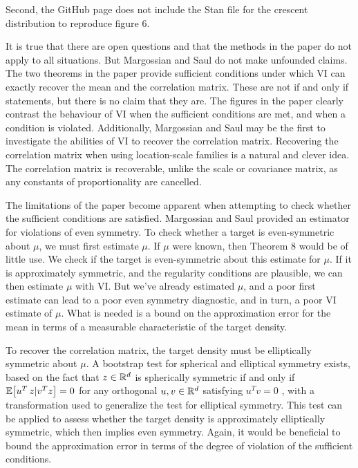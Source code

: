 \documentclass{article}
\begin{document}
Second, the GitHub page does not include the Stan file for the crescent distribution to reproduce figure 6.


It is true that there are open questions and that the methods in the paper do not apply to all situations.
But Margossian and Saul do not make unfounded claims.
The two theorems in the paper provide sufficient conditions under which VI can exactly recover the mean and the correlation matrix.
These are not if and only if statements, but there is no claim that they are.
The figures in the paper clearly contrast the behaviour of VI when the sufficient conditions are met, and when a condition is violated.
Additionally, Margossian and Saul may be the first to investigate the abilities of VI to recover the correlation matrix.
Recovering the correlation matrix when using location-scale families is a natural and clever idea.
The correlation matrix is recoverable, unlike the scale or covariance matrix, as any constants of proportionality are cancelled.

The limitations of the paper become apparent when attempting to check whether the sufficient conditions are satisfied.
Margossian and Saul provided an estimator for violations of even symmetry.
To check whether a target is even-symmetric about $\mu$, we must first estimate $\mu$.
If $\mu$ were known, then Theorem 8 would be of little use.
We check if the target is even-symmetric about this estimate for $\mu$.
If it is approximately symmetric, and the regularity conditions are plausible, we can then estimate $\mu$ with VI.
But we've already estimated $\mu$, and a poor first estimate can lead to a poor even symmetry diagnostic, and in turn, a poor VI estimate of $\mu$.
What is needed is a bound on the approximation error for the mean in terms of a measurable characteristic of the target density.

To recover the correlation matrix, the target density must be elliptically symmetric about $\mu$.
A bootstrap test for spherical and elliptical symmetry exists, based on the fact that $z \in \mathbb{R}^d$ is spherically symmetric if and only if
$\E \lt[u^T \, z | v^T z \rt] = 0$ for any orthogonal $u, v \in \mathbb{R}^d$ satisfying $u^T v = 0$ \cite{albisetti2020testing},
with a transformation used to generalize the test for elliptical symmetry.
This test can be applied to assess whether the target density is approximately elliptically symmetric, which then implies even symmetry.
Again, it would be beneficial to bound the approximation error in terms of the degree of violation of the sufficient conditions.
\end{document}
